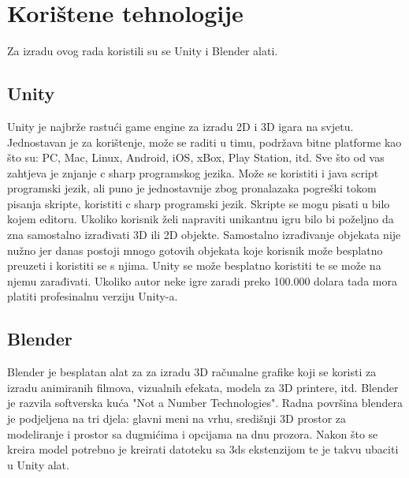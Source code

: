 \section{Korištene tehnologije}

Za izradu ovog rada koristili su se Unity i Blender alati. 
\subsection{Unity}

Unity je najbrže rastući game engine za izradu 2D i 3D igara na svjetu. Jednostavan je za korištenje, može se raditi u timu, podržava bitne platforme kao što su: PC, Mac, Linux, Android, iOS, xBox, Play Station, itd.
Sve što od vas zahtjeva je znjanje c sharp programskog jezika. Može se koristiti i java script programski jezik, ali puno je jednostavnije zbog pronalazaka pogreški tokom pisanja skripte, koristiti c sharp programski jezik. Skripte se mogu pisati u bilo kojem editoru. Ukoliko korisnik želi napraviti unikantnu igru bilo bi poželjno da zna samostalno izrađivati 3D ili 2D objekte. Samostalno izrađivanje objekata nije nužno jer danas postoji mnogo gotovih objekata koje korisnik može besplatno preuzeti i koristiti se s njima. 
Unity se može besplatno koristiti te se može na njemu zarađivati. Ukoliko autor neke igre zaradi preko 100.000 dolara tada mora platiti profesinalnu verziju Unity-a.

 
\subsection{Blender}

Blender je besplatan alat za za izradu 3D računalne grafike koji se koristi za izradu animiranih filmova, vizualnih efekata, modela za 3D printere, itd.
Blender je razvila softverska kuća "Not a Number Technologies". Radna površina blendera je podjeljena na tri djela: glavni meni na vrhu, središnji 3D prostor za modeliranje i prostor sa dugmićima i opcijama na dnu prozora. Nakon što se kreira model potrebno je kreirati datoteku sa 3ds ekstenzijom te je takvu ubaciti u Unity alat.